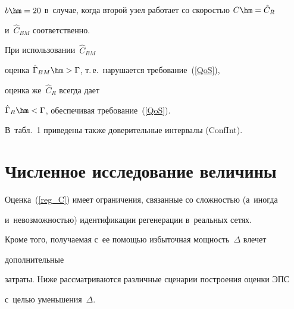 $b\hm=20$ в~случае, когда второй узел работает  со скоростью  $C\hm= \hat{C}_R$  


и~$\hat{C}_{BM}$ соответственно. 


При использовании~$\hat{C}_{BM} $


оценка $\hat{\Gamma}_{BM}\hm>\Gamma$,  т.\,е.\ нарушается   требование~(\ref{QoS}),


оценка же~$\hat{C}_R $ всегда дает


$\hat{\Gamma}_R\hm<\Gamma$, обеспечивая требование~(\ref{QoS}).


 В~табл.~1 приведены также доверительные  интервалы (ConfInt).


 











\section{Численное исследование величины~{\boldmath{$\Delta$}}}





Оценка~(\ref{reg_C}) имеет    ограничения, связанные со сложностью (а~иногда 


и~невозможностью) идентификации  регенерации в~реальных сетях.


 Кроме того, получаемая с~ее помощью избыточная мощность~$\Delta$  влечет 


дополнительные


затраты.  Ниже рассматриваются различные сценарии построения  оценки ЭПС  


с~целью уменьшения~$\Delta$.


